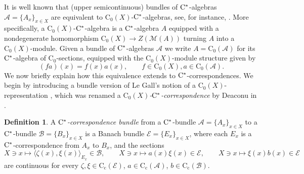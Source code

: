 \documentclass[11 pt, leqno]{amsart}
\numberwithin{equation}{section}
\theoremstyle{plain}
\theoremstyle{definition}
\newtheorem {defn}[thm] {Definition}
\newcommand*{\contc}{\mathrm{C_c}}%
\newcommand*{\contz}{\mathrm{C_0}}%
\newcommand{\B}{\mathcal B}
\newcommand{\LL}{\mathcal L}
\newcommand{\M}{\mathcal M}
\newcommand{\EE}{\mathcal E}
\newcommand{\A}{\mathcal A}
\newcommand{\cst}{\ifmmode\mathrm{C}^*\else{$\mathrm{C}^*$}\fi}
\begin{document}
It is well known that (upper semicontinuous) bundles of $\cst$-algebras $\A=\{A_x\}_{x\in X}$ are equivalent to $\contz(X)$-$\cst$-algebras, see, for instance, \cite[Appendix C]{WLbook}. 
More specifically, a $\contz(X)$-$\cst$-algebra is a $\cst$-algebra $A$ equipped with a nondegenerate homomorphism $\contz(X)\to Z(\M(A))$ turning $A$ into a $\contz(X)$-module. 
Given a bundle of $\cst$-algebras $\A$ we write $A=\contz(\A)$ for its $\cst$-algebra of $\contz$-sections, equipped with the $\contz(X)$-module structure given by
\[
    (fa) (x)= f(x)a(x), \qquad f\in \contz(X) , a\in \contz(\A).
\]
We now briefly explain how this equivalence extends to $\cst$-correspondences. 
We begin by introducing a bundle version of Le Gall's notion of a $\contz(X)$-representation \cite[Definition 4.1]{LeGall}, which was renamed a \emph{$\contz(X)$-$\cst$-correspondence} by Deaconu in \cite[Definition 5.8]{Deaconu}.

\begin{defn}\label{def:Correspondence_bundle}
A \emph{$\cst$-correspondence bundle} from a $\cst$-bundle $\A=\{A_x\}_{x\in X}$ to a  $\cst$-bundle $\B=\{B_x\}_{x\in X}$ is a Banach bundle $\EE=\{E_x\}_{x\in X}$, where each $E_x$ is a $\cst$-correspondence from $A_x$ to $B_x$, and the sections
\[
    X\ni x \mapsto  \langle \zeta(x),\xi(x)\rangle_{E_x}\in  \B, \qquad X\ni x \mapsto  a(x)\xi(x)\in  \EE, \qquad X\ni x \mapsto  \xi(x)b(x)\in  \EE
\]
are continuous for every $\zeta, \xi \in \contc(\EE)$, $a\in  \contc(\A)$, $b\in \contc(\B)$. 
\end{defn}
\end{document}
